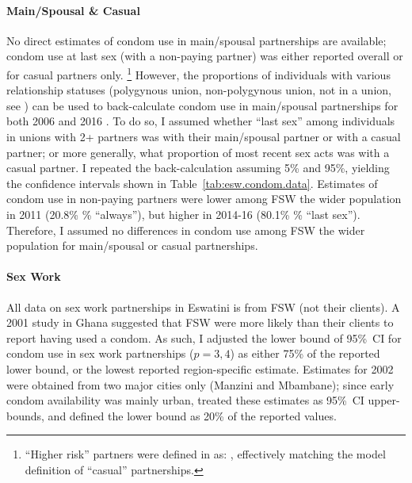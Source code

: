 \paragraph{Main/Spousal \& Casual}
No direct estimates of condom use in main/spousal partnerships are available;
condom use at last sex (with a non-paying partner)
was either reported overall or for casual partners only.%
\footnote{``Higher risk'' partners were defined in \cite{SDHS2006} as:
  ,
  effectively matching the model definition of ``casual'' partnerships.}
However, the proportions of individuals with various relationship statuses
(\eg polygynous union, non-polygynous union, not in a union, see )
can be used to back-calculate condom use in main/spousal partnerships
for both 2006 \cite{SDHS2006} and 2016 \cite{SHIMS2}.
To do so, I assumed whether ``last sex'' among individuals in unions with 2+ partners
was with their main/spousal partner or with a casual partner;
or more generally, what proportion of most recent sex acts was with a casual partner.
I repeated the back-calculation assuming 5\% and 95\%,
yielding the confidence intervals shown in Table~\ref{tab:esw.condom.data}.
Estimates of condom use in non-paying partners were
lower among FSW \vs the wider population in 2011 (20.8\% \vs {}\% ``always''), but
higher in 2014-16 (80.1\% \vs {}\% ``last sex'').
Therefore, I assumed no differences in condom use
among FSW \vs the wider population for main/spousal or casual partnerships.
\paragraph{Sex Work}
All data on sex work partnerships in Eswatini is from FSW (\ie not their clients).
A 2001 study in Ghana \cite{Cote2004} suggested that
FSW were more likely than their clients to report having used a condom.
As such, I adjusted the lower bound of 95\%~CI for condom use in sex work partnerships ($p=3,4$)
as either 75\% of the reported lower bound, or the lowest reported region-specific estimate.
Estimates for 2002 \cite{EswBSS2002} were obtained from two major cities only (Manzini and Mbambane);
since early condom availability was mainly urban,
treated these estimates as 95\%~CI upper-bounds,
and defined the lower bound as 20\% of the reported values.
